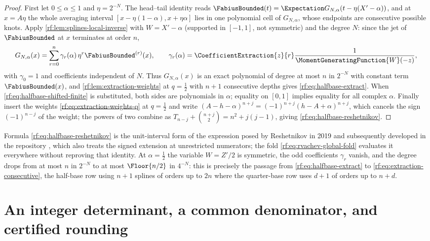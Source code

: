 \documentclass[11pt,oneside]{article}
\theoremstyle{plain}
\theoremstyle{definition}
\theoremstyle{remark}
\newcommand{\Fb}{\FabiusBounded}            %
\newcommand{\E}{\Expectation}
\newcommand{\coeff}[2]{\CoefficientExtraction{#1}{#2}}
\newcommand{\Tr}[1]{T_{#1}}                 %
\begin{document}
\begin{proof}
First let $0\le\alpha\le1$ and $\eta=2^{-N}$.  The head--tail identity
reads $\Fb(t)=\E G_{N,\alpha}(t-\eta(X'-\alpha))$, and at $x=A\eta$ the
whole averaging interval $[x-\eta(1-\alpha),x+\eta\alpha]$ lies in one
polynomial cell of $G_{N,\alpha}$, whose endpoints are consecutive possible
knots.  Apply \cref{rf:lem:splines-local-inverse} with $W=X'-\alpha$
(supported in $[-1,1]$, not symmetric) and the degree $N$: since the jet of
$\Fb$ at $x$ terminates at order $n$,
\[
 G_{N,\alpha}(x)=\sum_{r=0}^{n}\gamma_{r}(\alpha)\,\eta^{r}\Fb^{(r)}(x),\qquad
 \gamma_{r}(\alpha)=\coeff{z}{r}\frac{1}{\MomentGeneratingFunction{W}(-z)},
\]
with $\gamma_{0}=1$ and coefficients independent of $N$.  Thus
$G_{N,\alpha}(x)$ is an exact polynomial of degree at most $n$ in $2^{-N}$
with constant term $\Fb(x)$, and \cref{rf:lem:extraction-weights} at
$q=\tfrac12$ with $n+1$ consecutive depths gives
\cref{rf:eq:halfbase-extract}.  When \cref{rf:eq:halfbase-shifted-finite}
is substituted, both sides are polynomials in $\alpha$; equality on $[0,1]$
implies equality for all complex $\alpha$.  Finally insert the weights
\cref{rf:eq:extraction-weights-q} at $q=\tfrac12$ and write
$(A-h-\alpha)^{n+j}=(-1)^{n+j}(h-A+\alpha)^{n+j}$, which cancels the sign
$(-1)^{n-j}$ of the weight; the powers of two combine as
$\Tr{n-j}+\binom{n+j}{2}=n^{2}+j(j-1)$, giving
\cref{rf:eq:halfbase-reshetnikov}.
\end{proof}

Formula \cref{rf:eq:halfbase-reshetnikov} is the unit-interval form of the
expression posed by Reshetnikov in 2019 \cite{reshetnikov2019} and
subsequently developed in the repository \cite{proveit-primary}, which also
treats the signed extension at unrestricted numerators; the fold
\cref{rf:eq:rvachev-global-fold} evaluates it everywhere without reproving
that identity.  At $\alpha=\tfrac12$ the variable $W=Z'/2$ is symmetric, the
odd coefficients $\gamma_{r}$ vanish, and the degree drops from at most $n$
in $2^{-N}$ to at most $\Floor{n/2}$ in $4^{-N}$: this is precisely the
passage from \cref{rf:eq:halfbase-extract} to
\cref{rf:eq:extraction-consecutive}, the half-base row using $n+1$ splines
of orders up to $2n$ where the quarter-base row uses $d+1$ of orders up to
$n+d$.

\section{An integer determinant, a common denominator, and certified rounding}
\label{rf:sec:determinant}
\end{document}
